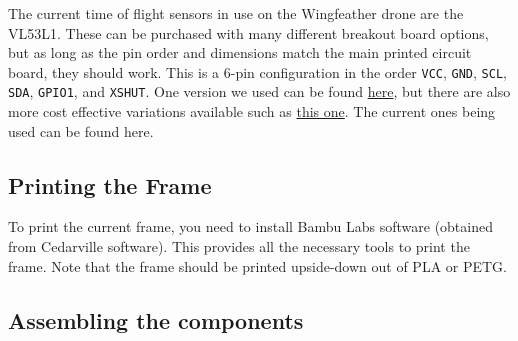 \documentclass[12pt, titlepage]{article}
\begin{document}
The current time of flight sensors in use on the Wingfeather drone are the VL53L1. These can be purchased with many different breakout board options, but as long as the pin order and dimensions match the main printed circuit board, they should work. This is a 6-pin configuration in the order \texttt{VCC}, \texttt{GND}, \texttt{SCL}, \texttt{SDA}, \texttt{GPIO1}, and \texttt{XSHUT}. One version we used can be found \href{https://www.amazon.com/DWEII-Measurement-Extension-Compatible-Raspberry/dp/B09V4DS888?tag=bngsmtphsnus-20&linkCode=df0&hvadid=79989669526635&hvnetw=s&hvqmt=e&hvbmt=be&hvdev=c&hvlocint=&hvlocphy=93603&hvtargid=pla-4583589133736495&psc=1}{here}, but there are also more cost effective variations available such as \href{https://www.ebay.com/itm/335880426834?_skw=vl53l1x&itmmeta=01KBQMDZ36P3727PVEQP04QS72&hash=item4e34089552%3Ag%3AXFkAAOSwfHtn42--&itmprp=enc%3AAQAKAAAA4FkggFvd1GGDu0w3yXCmi1fhVCjvI%2B6gXNmTwNwV%2FI08OUnLs7IEiPrwcSOQ1Qxs53Oeh6PQi9Sw%2FcOp7kobl6Ifs5FaNnmMREjD2HPECAXtjsOyEYjA2zgul1N4Th7ZBKM5KZQoCGErFpuL91vwmSvskTtpQBmZ2eRHIJpe1Q2J%2BLSHlZlbRMI7wtpZmEi1SievedcCKPnAg5mRAvRSu5SnSRFxJCjBVXbOwuE5daF3NWeITinfEQQS144ojU420kFEqwyifo2z6LeLFOEN2KV21gZf9PkgrligSrAzT1ks|tkp%3ABFBM3vG39N1m&var=545425037697}{this one}. The current ones being used can be found here.

\subsection{Printing the Frame}
To print the current frame, you need to install Bambu Labs software (obtained from Cedarville software). This provides all the necessary tools to print the frame. Note that the frame should be printed upside-down out of PLA or PETG.

\subsection{Assembling the components}
\end{document}
